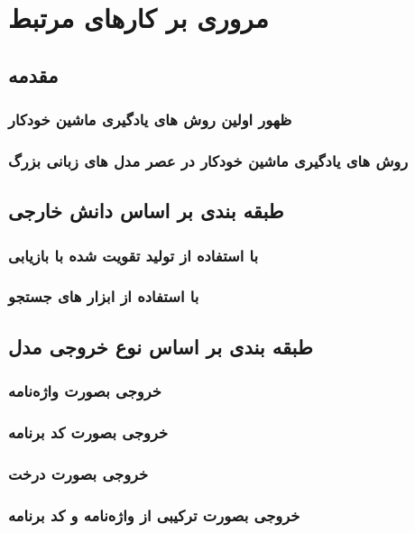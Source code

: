 \chapter{مروری بر کارهای مرتبط}
\thispagestyle{empty}

\section{مقدمه}
\subsection{ظهور اولین روش های یادگیری ماشین خودکار}
\subsection{روش های یادگیری ماشین خودکار در عصر مدل های زبانی بزرگ}


\section{طبقه بندی بر اساس دانش خارجی}
\subsection{با استفاده از تولید تقویت شده با بازیابی}
\subsection{با استفاده از ابزار های جستجو}
\section{طبقه بندی بر اساس نوع خروجی مدل}
\subsection{خروجی بصورت واژه‌نامه}
\subsection{خروجی بصورت کد برنامه}
\subsection{خروجی بصورت درخت}
\subsection{خروجی بصورت ترکیبی از واژه‌نامه و کد برنامه}
